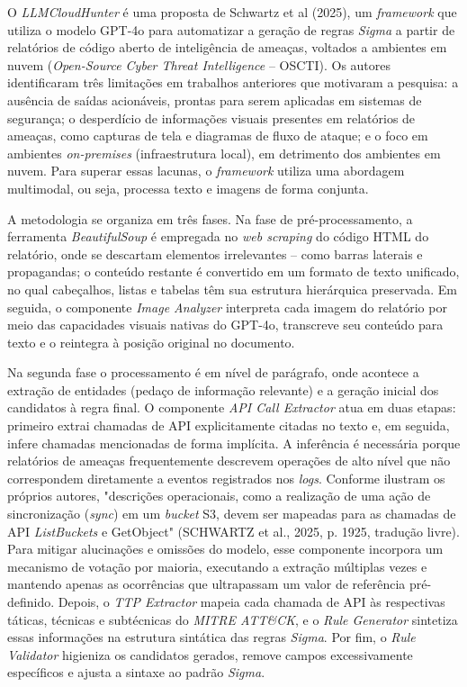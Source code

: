 O \textit{LLMCloudHunter} é uma proposta de Schwartz et al (2025), um \textit{framework} que utiliza o modelo \gls{GPT}-4o para automatizar a geração de regras \textit{Sigma} a partir de relatórios de código aberto de inteligência de ameaças, 
voltados a ambientes em nuvem (\textit{Open-Source Cyber Threat Intelligence} -- OSCTI). 
Os autores identificaram três limitações em trabalhos anteriores que motivaram a pesquisa: 
a ausência de saídas acionáveis, prontas para serem aplicadas em sistemas de segurança; 
o desperdício de informações visuais presentes em relatórios de ameaças, como capturas de tela e diagramas de fluxo de ataque; 
e o foco em ambientes \textit{on-premises} (infraestrutura local), em detrimento dos ambientes em nuvem. 
Para superar essas lacunas, o \textit{framework} utiliza uma abordagem multimodal, ou seja, processa texto e imagens de forma conjunta.

A metodologia se organiza em três fases.
Na fase de pré-processamento, a ferramenta \textit{\gls{BeautifulSoup}} é empregada no \textit{web scraping} do código HTML do relatório, 
onde se descartam elementos irrelevantes -- como barras laterais e propagandas; 
o conteúdo restante é convertido em um formato de texto unificado, no qual cabeçalhos, listas e tabelas têm sua estrutura hierárquica preservada. 
Em seguida, o componente \textit{Image Analyzer} interpreta cada imagem do relatório por meio das capacidades visuais nativas do \gls{GPT}-4o, 
transcreve seu conteúdo para texto e o reintegra à posição original no documento.

Na segunda fase o processamento é em nível de parágrafo, onde acontece a extração de entidades (pedaço de informação relevante) e a geração inicial dos candidatos à regra final. 
O componente \textit{API Call Extractor} atua em duas etapas:
primeiro extrai chamadas de API explicitamente citadas no texto e, em seguida, infere chamadas mencionadas de forma implícita.
A inferência é necessária porque relatórios de ameaças frequentemente descrevem operações de alto nível que não correspondem diretamente a eventos registrados nos \textit{logs}.
Conforme ilustram os próprios autores, "descrições operacionais, como a realização de uma ação de sincronização (\textit{sync}) em um \textit{bucket} S3, devem ser mapeadas para as chamadas de API \textit{ListBuckets} e GetObject" (SCHWARTZ et al., 2025, p. 1925, tradução livre). 
Para mitigar alucinações e omissões do modelo, esse componente incorpora um mecanismo de votação por maioria, 
executando a extração múltiplas vezes e mantendo apenas as ocorrências que ultrapassam um valor de referência pré-definido.
Depois, o \textit{TTP Extractor} mapeia cada chamada de API às respectivas táticas, técnicas e subtécnicas do \textit{MITRE ATT&CK}, 
e o \textit{Rule Generator} sintetiza essas informações na estrutura sintática das regras \textit{Sigma}. 
Por fim, o \textit{Rule Validator} higieniza os candidatos gerados, remove campos excessivamente específicos e ajusta a sintaxe ao padrão \textit{Sigma}.

